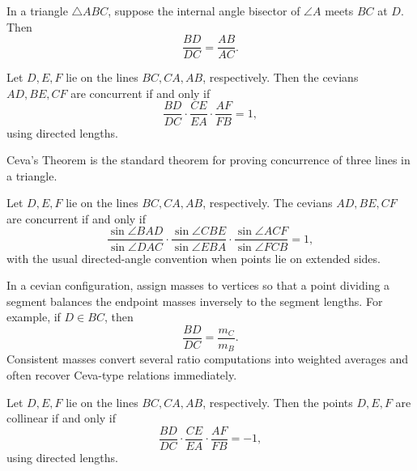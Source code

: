     \begin{theorem}
        In a triangle $\triangle ABC$, suppose the internal angle bisector of
        $\angle A$ meets $BC$ at $D$. Then
        \[
            \frac{BD}{DC}
            =
            \frac{AB}{AC}.
        \]
    \end{theorem}

    \begin{theorem}
        Let $D,E,F$ lie on the lines $BC,CA,AB$, respectively. Then the cevians
        $AD,BE,CF$ are concurrent if and only if
        \[
            \frac{BD}{DC}
            \cdot
            \frac{CE}{EA}
            \cdot
            \frac{AF}{FB}
            =
            1,
        \]
        using directed lengths.
    \end{theorem}

    \begin{remark}
        Ceva's Theorem is the standard theorem for proving concurrence of three
        lines in a triangle.
    \end{remark}

    \begin{theorem}
        Let $D,E,F$ lie on the lines $BC,CA,AB$, respectively. The cevians
        $AD,BE,CF$ are concurrent if and only if
        \[
            \frac{\sin\angle BAD}{\sin\angle DAC}
            \cdot
            \frac{\sin\angle CBE}{\sin\angle EBA}
            \cdot
            \frac{\sin\angle ACF}{\sin\angle FCB}
            =1,
        \]
        with the usual directed-angle convention when points lie on extended
        sides.
    \end{theorem}

    \begin{strategy}
        In a cevian configuration, assign masses to vertices so that a point
        dividing a segment balances the endpoint masses inversely to the segment
        lengths. For example, if $D\in BC$, then
        \[
            \frac{BD}{DC}=\frac{m_C}{m_B}.
        \]
        Consistent masses convert several ratio computations into weighted
        averages and often recover Ceva-type relations immediately.
    \end{strategy}

    \begin{theorem}
        Let $D,E,F$ lie on the lines $BC,CA,AB$, respectively. Then the points
        $D,E,F$ are collinear if and only if
        \[
            \frac{BD}{DC}
            \cdot
            \frac{CE}{EA}
            \cdot
            \frac{AF}{FB}
            =
            -1,
        \]
        using directed lengths.
    \end{theorem}

